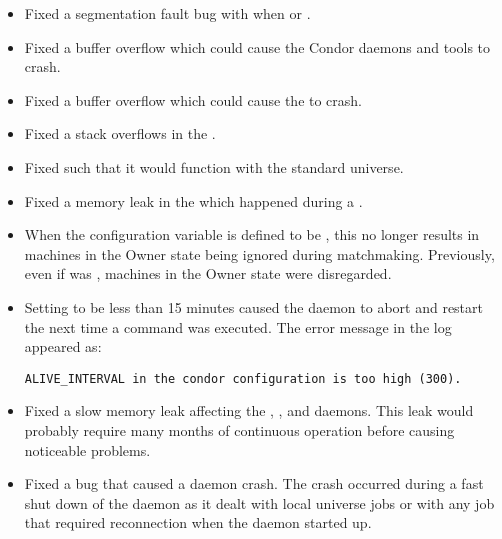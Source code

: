 \begin{itemize}

\item Fixed a segmentation fault bug with   when
 or .

\item Fixed a buffer overflow which could cause the Condor daemons and tools
to crash.

\item Fixed a buffer overflow which could cause the  to crash.

\item Fixed a stack overflows in the .

\item Fixed   such that it would function with the
standard universe.

\item Fixed a memory leak in the  which happened during a
.

\item When the configuration variable 
is defined to be ,
this no longer results in machines in the Owner state being ignored
during matchmaking.  Previously, even if  was ,
machines in the Owner state were disregarded.

\item Setting  to be less than 15 minutes caused the
 daemon to abort and restart the next time a
 command was executed.
The error message in the  log appeared as:

\footnotesize
\begin{verbatim}
ALIVE_INTERVAL in the condor configuration is too high (300).
\end{verbatim}
\normalsize

\item Fixed a slow memory leak affecting the ,
, and  daemons.  This leak would probably
require many months of continuous operation before causing noticeable problems.

\item Fixed a bug that caused a  daemon crash.
The crash occurred during a fast shut down of the
 daemon as it dealt with local universe
jobs or with any job that required reconnection when
the  daemon started up.


\end{itemize}

